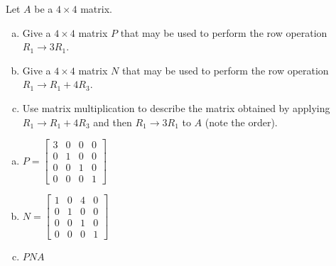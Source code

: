 
\begin{exerciseStatement}


Let \(A\) be a \(4 \times 4\) matrix.


\begin{enumerate}[(a)]
\item Give a \(4 \times 4\) matrix \(P\) that may be used to perform the row operation \( R_1 \to 3R_1 \).
\item Give a \(4 \times 4\) matrix \(N\) that may be used to perform the row operation \( R_1 \to R_1 + 4R_3 \).
\item Use matrix multiplication to describe the matrix obtained by applying \( R_1 \to R_1 + 4R_3 \) and then \( R_1 \to 3R_1 \) to \(A\) (note the order). 
\end{enumerate}
    
\end{exerciseStatement}
    
\begin{exerciseAnswer} 

\begin{enumerate}[(a)]
\item \(P= \left[\begin{array}{cccc}
3 & 0 & 0 & 0 \\
0 & 1 & 0 & 0 \\
0 & 0 & 1 & 0 \\
0 & 0 & 0 & 1
\end{array}\right] \)
\item \(N= \left[\begin{array}{cccc}
1 & 0 & 4 & 0 \\
0 & 1 & 0 & 0 \\
0 & 0 & 1 & 0 \\
0 & 0 & 0 & 1
\end{array}\right] \)
\item \(PNA\)
\end{enumerate}
    
\end{exerciseAnswer}
    
